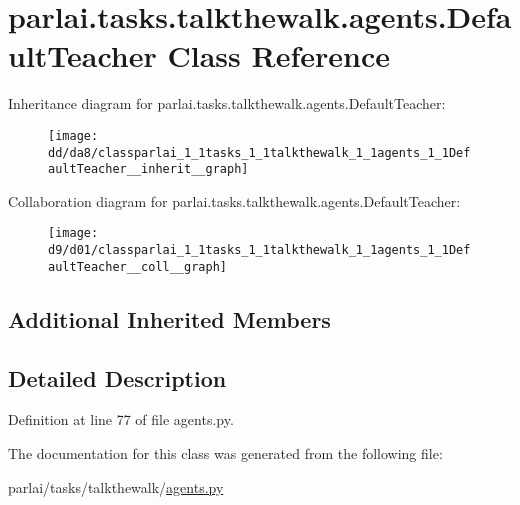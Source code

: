 \hypertarget{classparlai_1_1tasks_1_1talkthewalk_1_1agents_1_1DefaultTeacher}{}\section{parlai.\+tasks.\+talkthewalk.\+agents.\+Default\+Teacher Class Reference}
\label{classparlai_1_1tasks_1_1talkthewalk_1_1agents_1_1DefaultTeacher}


Inheritance diagram for parlai.\+tasks.\+talkthewalk.\+agents.\+Default\+Teacher\+:
\nopagebreak
\begin{figure}[H]
\begin{center}
\leavevmode
\texttt{[image: dd/da8/classparlai\_1\_1tasks\_1\_1talkthewalk\_1\_1agents\_1\_1DefaultTeacher\_\_inherit\_\_graph]}
\end{center}
\end{figure}


Collaboration diagram for parlai.\+tasks.\+talkthewalk.\+agents.\+Default\+Teacher\+:
\nopagebreak
\begin{figure}[H]
\begin{center}
\leavevmode
\texttt{[image: d9/d01/classparlai\_1\_1tasks\_1\_1talkthewalk\_1\_1agents\_1\_1DefaultTeacher\_\_coll\_\_graph]}
\end{center}
\end{figure}
\subsection*{Additional Inherited Members}


\subsection{Detailed Description}


Definition at line 77 of file agents.\+py.



The documentation for this class was generated from the following file\+:\begin{DoxyCompactItemize}
\item 
parlai/tasks/talkthewalk/\hyperlink{parlai_2tasks_2talkthewalk_2agents_8py}{agents.\+py}\end{DoxyCompactItemize}
